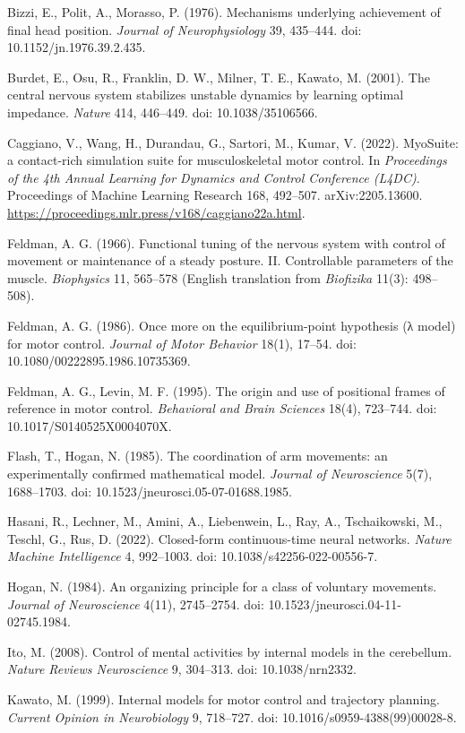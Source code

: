 \documentclass[
  11pt,
]{article}
\begin{document}
Bizzi, E., Polit, A., Morasso, P. (1976). Mechanisms underlying
achievement of final head position. \emph{Journal of Neurophysiology}
39, 435--444. doi: 10.1152/jn.1976.39.2.435.

Burdet, E., Osu, R., Franklin, D. W., Milner, T. E., Kawato, M. (2001).
The central nervous system stabilizes unstable dynamics by learning
optimal impedance. \emph{Nature} 414, 446--449. doi: 10.1038/35106566.

Caggiano, V., Wang, H., Durandau, G., Sartori, M., Kumar, V. (2022).
MyoSuite: a contact-rich simulation suite for musculoskeletal motor
control. In \emph{Proceedings of the 4th Annual Learning for Dynamics
and Control Conference (L4DC)}. Proceedings of Machine Learning Research
168, 492--507. arXiv:2205.13600.
\url{https://proceedings.mlr.press/v168/caggiano22a.html}.

Feldman, A. G. (1966). Functional tuning of the nervous system with
control of movement or maintenance of a steady posture. II. Controllable
parameters of the muscle. \emph{Biophysics} 11, 565--578 (English
translation from \emph{Biofizika} 11(3): 498--508).

Feldman, A. G. (1986). Once more on the equilibrium-point hypothesis (λ
model) for motor control. \emph{Journal of Motor Behavior} 18(1),
17--54. doi: 10.1080/00222895.1986.10735369.

Feldman, A. G., Levin, M. F. (1995). The origin and use of positional
frames of reference in motor control. \emph{Behavioral and Brain
Sciences} 18(4), 723--744. doi: 10.1017/S0140525X0004070X.

Flash, T., Hogan, N. (1985). The coordination of arm movements: an
experimentally confirmed mathematical model. \emph{Journal of
Neuroscience} 5(7), 1688--1703. doi: 10.1523/jneurosci.05-07-01688.1985.

Hasani, R., Lechner, M., Amini, A., Liebenwein, L., Ray, A.,
Tschaikowski, M., Teschl, G., Rus, D. (2022). Closed-form
continuous-time neural networks. \emph{Nature Machine Intelligence} 4,
992--1003. doi: 10.1038/s42256-022-00556-7.

Hogan, N. (1984). An organizing principle for a class of voluntary
movements. \emph{Journal of Neuroscience} 4(11), 2745--2754. doi:
10.1523/jneurosci.04-11-02745.1984.

Ito, M. (2008). Control of mental activities by internal models in the
cerebellum. \emph{Nature Reviews Neuroscience} 9, 304--313. doi:
10.1038/nrn2332.

Kawato, M. (1999). Internal models for motor control and trajectory
planning. \emph{Current Opinion in Neurobiology} 9, 718--727. doi:
10.1016/s0959-4388(99)00028-8.
\end{document}
